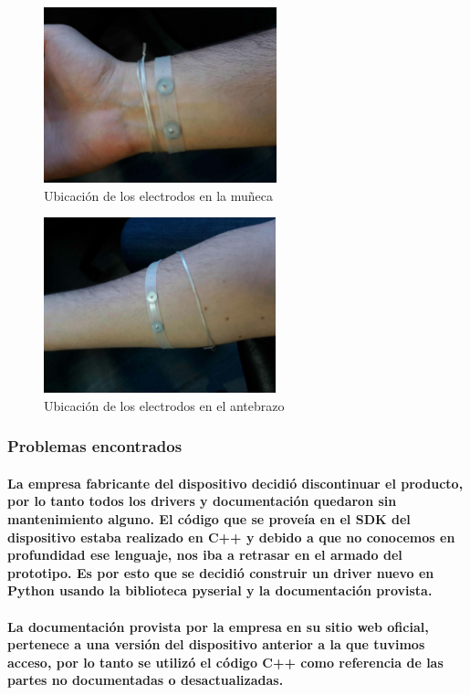 \documentclass{article}
\begin{document}
\begin{figure}[ht]
    \centering
    \includegraphics[height=2in]{electrodo_munieca.png}%
    \caption{Ubicación de los electrodos en la muñeca}
    \label{fig:electrodos1}
\end{figure}

\begin{figure}[ht]
    \centering
    \includegraphics[height=2in]{electrodo_antebrazo.png}%
    \caption{Ubicación de los electrodos en el antebrazo}
    \label{fig:electrodos2}
\end{figure}

\subsubsection{Problemas encontrados}
\paragraph{
La empresa fabricante del dispositivo decidió discontinuar el producto, por lo tanto todos los drivers y documentación quedaron sin mantenimiento alguno. El código que se proveía en el SDK del dispositivo estaba realizado en C++ y debido a que no conocemos en profundidad ese lenguaje, nos iba a retrasar en el armado del prototipo. Es por esto que se decidió construir un driver nuevo en Python usando la biblioteca pyserial y la documentación provista.
}
\paragraph{
La documentación provista por la empresa en su sitio web oficial, pertenece a una versión del dispositivo anterior a la que tuvimos acceso, por lo tanto se utilizó el código C++ como referencia de las partes no documentadas o desactualizadas.
}
\end{document}
